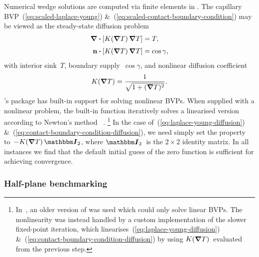Numerical wedge solutions are computed
via finite elements in .
The capillary BVP~(\ref{eq:scaled-laplace-young})
\&~(\ref{eq:scaled-contact-boundary-condition})
may be viewed as the steady-state diffusion problem
\begin{align}
  \del \dotp \squarebr[\bulkysize]{K (\del T) \del T} &= T,
    \label{eq:laplace-young-diffusion}
    \\[\tallspace]
  \normalvec \dotp \squarebr[\bulkysize]{K (\del T) \del T} &= \cos\gamma,
  \label{eq:contact-boundary-condition-diffusion}
\end{align}
with interior sink~$T$, boundary supply~$\cos\gamma$,
and nonlinear diffusion coefficient
\begin{equation}
  K (\mathop{}\!\boldsymbol{\mathbf{\nabla}} T) = \frac{1}{\sqrt{1 + (\mathop{}\!\boldsymbol{\mathbf{\nabla}} T)^2}}.
  \label{eq:laplace-young-diffusion-coefficient}
\end{equation}
's  package
has built-in support for solving nonlinear BVPs.
When supplied with a nonlinear problem,
the built-in function 
iteratively solves a linearised version
according to Newton's method~%
  \cite{wolfram-2020-documentation-finite-element-programming}.%
\footnote{
  In~\cite{li-2017-thesis-rounding-capillary-wedge},
  an older version of  was used
  which could only solve linear BVPs.
  The nonlinearity was instead handled
  by a custom implementation of the slower fixed-point iteration,
  which linearises~(\ref{eq:laplace-young-diffusion})
  \&~(\ref{eq:contact-boundary-condition-diffusion})
  by using $K (\mathop{}\!\boldsymbol{\mathbf{\nabla}} T)$~evaluated from the previous step.
}
In the case of~(\ref{eq:laplace-young-diffusion})
\&~(\ref{eq:contact-boundary-condition-diffusion}),
we need simply set the  property
to~$-K (\del T) \idenmat[2]$,
where $\idenmat[2]$~is the $2 \times 2$ identity matrix.
In all instances
we find that the default initial guess of the zero function
is sufficient for achieving convergence.

\subsubsection{Half-plane benchmarking}
\label{sec:moderate.nonlinear.numerical.half-plane}

